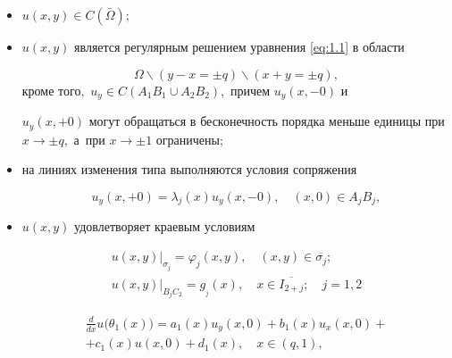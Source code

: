 \begin{itemize}

\item[\rm 1)] $u(x,y) \in C(\bar \Omega );$

\item[\rm 2)] $u(x, y)$ является регулярным решением уравнения \eqref{eq:1.1} в области 

$$\Omega \backslash (y - x =  \pm q)\backslash (x + y =  \pm q),$$ кроме того$,$ ${u_y} \in C({A_1}{B_1} \cup A_2B_2),$ причем ${u_y}(x, - 0)$ и

${u_y}(x, + 0)$ могут обращаться в бесконечность порядка меньше единицы при $x \to  \pm q,$ а~при  $x \to  \pm 1$ ограничены$;$

\item[\rm 3)]  на линиях изменения типа выполняются условия сопряжения

\begin{equation}

{u_y}(x, + 0) = {\lambda _j}(x){u_y}(x, - 0),\quad (x, 0) \in {A_j}{B_j}, 

\label{eq:3.j}

\end{equation}

\item[\rm 4)]   $u(x,y)$ удовлетворяет краевым условиям

\begin{gather}

u(x,y)\bigr|_{\sigma _j}  = {\varphi _j}(x,y),\quad (x,y) \in \overline {\sigma _j};  

\label{eq:4.j}

\\

u(x,y)\bigr|_{B_jC_2} = g_{_j}(x), \quad x \in \overline {I_{2 + j}}; 

\quad  j=1, 2 \label{eq:5.j}

\end{gather}

\begin{multline}

\frac{d}{{dx}}u \bigl( \theta _1(x)\bigr) 

= {a_1}(x){u_y}(x, 0) + {b_1}(x){u_x}(x, 0) + \\ + {c_1}(x)u(x, 0) + {d_1}(x),\quad  x \in (q, 1),\label{eq:6.1}

\end{multline}

\begin{multline}


\end{multline}
\end{itemize}
